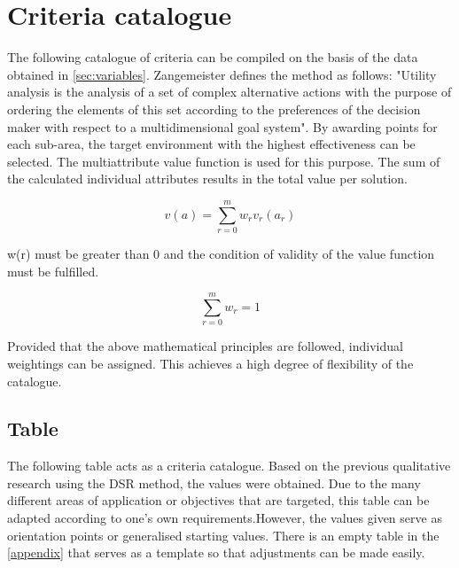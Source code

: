 \documentclass[MSC,Master,english]{twbook}%
\begin{document}
\section{Criteria catalogue}
\label{sec:cc}
The following catalogue of criteria can be compiled on the basis of the data obtained in \autoref{sec:variables}. Zangemeister defines the method as follows: "Utility analysis is the analysis of a set of complex alternative actions with the purpose of ordering the elements of this set according to the preferences of the decision maker with respect to a multidimensional goal system"\cite{nwa}. By awarding points for each sub-area, the target environment with the highest effectiveness can be selected. The multiattribute value function is used for this purpose. The sum of the calculated individual attributes results in the total value per solution.

\begin{equation*}
v(a) = \sum \limits_{r=0}^{m}w_{r} v_{r} (a_{r})
\end{equation*}

w(r) must be greater than 0 and the condition of validity of the value function must be fulfilled.

\begin{equation*}
\sum \limits_{r=0}^{m} w_{r} = 1
\end{equation*}

Provided that the above mathematical principles are followed, individual weightings can be assigned. This achieves a high degree of flexibility of the catalogue. 

\subsection{Table}
The following table acts as a criteria catalogue. Based on the previous qualitative research using the \ac{DSR} method, the values were obtained. Due to the many different areas of application or objectives that are targeted, this table can be adapted according to one's own requirements.However, the values given serve as orientation points or generalised starting values. There is an empty table in the \autoref{appendix} that serves as a template so that adjustments can be made easily.
\end{document}
